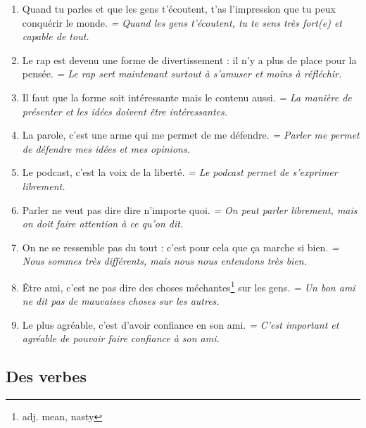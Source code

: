 \documentclass[math,code]{amznotes}
\theoremstyle{remark}
\begin{document}
\begin{enumerate}
    \item Quand tu parles et que les gens t'écoutent, t'as l'impression que tu peux conquérir le monde. \textit{= Quand les gens t'écoutent, tu te sens très fort(e) et capable de tout.}

    \item Le rap est devenu une forme de divertissement : il n'y a plus de place pour la pensée. \textit{= Le rap sert maintenant surtout à s'amuser et moins à réfléchir.}

    \item Il faut que la forme soit intéressante mais le contenu aussi. \textit{= La manière de présenter et les idées doivent être intéressantes.}

    \item La parole, c'est une arme qui me permet de me défendre. \textit{= Parler me permet de défendre mes idées et mes opinions.}

    \item Le podcast, c'est la voix de la liberté. \textit{= Le podcast permet de s'exprimer librement.}

    \item Parler ne veut pas dire dire n'importe quoi. \textit{= On peut parler librement, mais on doit faire attention à ce qu'on dit.}

    \item On ne se ressemble pas du tout : c'est pour cela que ça marche si bien. \textit{= Nous sommes très différents, mais nous nous entendons très bien.}

    \item Être ami, c'est ne pas dire des choses méchantes\footnote{adj. mean, nasty} sur les gens. \textit{= Un bon ami ne dit pas de mauvaises choses sur les autres.}

    \item Le plus agréable, c'est d'avoir confiance en son ami. \textit{= C'est important et agréable de pouvoir faire confiance à son ami.}
\end{enumerate}

\subsection*{Des verbes}
\end{document}
